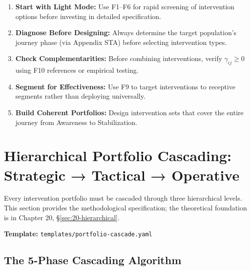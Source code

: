 \begin{tcolorbox}[colback=green!5!white, colframe=green!75!black,
    title=Practical Implications]
\begin{enumerate}
\item \textbf{Start with Light Mode:} Use F1--F6 for rapid screening of intervention options before investing in detailed specification.

\item \textbf{Diagnose Before Designing:} Always determine the target population's journey phase (via Appendix STA) before selecting intervention types.

\item \textbf{Check Complementarities:} Before combining interventions, verify $\gamma_{ij} \geq 0$ using F10 references or empirical testing.

\item \textbf{Segment for Effectiveness:} Use F9 to target interventions to receptive segments rather than deploying universally.

\item \textbf{Build Coherent Portfolios:} Design intervention sets that cover the entire journey from Awareness to Stabilization.
\end{enumerate}
\end{tcolorbox}


\section{Hierarchical Portfolio Cascading: Strategic → Tactical → Operative}
\label{sec:hhh-cascade}

\begin{tcolorbox}[colback=purple!5!white, colframe=purple!75!black,
    title=\textbf{Canonical Method: Portfolio Cascading (Ch.\,20 Integration)}]
Every intervention portfolio must be cascaded through three hierarchical levels.
This section provides the methodological specification; the theoretical foundation
is in Chapter 20, \S\ref{sec:20-hierarchical}.

\textbf{Template:} \texttt{templates/portfolio-cascade.yaml}
\end{tcolorbox}

\subsection{The 5-Phase Cascading Algorithm}
\label{sec:hhh-cascade-algorithm}

